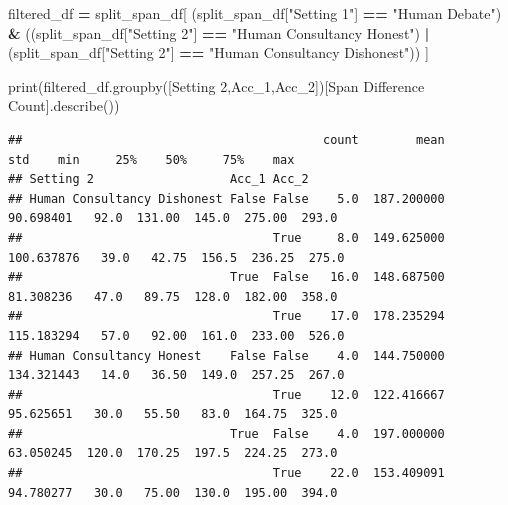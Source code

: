 \documentclass[
]{article}
\newenvironment{Shaded}{\begin{snugshade}}{\end{snugshade}}
\newcommand{\BuiltInTok}[1]{#1}
\newcommand{\NormalTok}[1]{#1}
\newcommand{\OperatorTok}[1]{\textcolor[rgb]{0.81,0.36,0.00}{\textbf{#1}}}
\newcommand{\StringTok}[1]{\textcolor[rgb]{0.31,0.60,0.02}{#1}}
\begin{document}
\begin{Shaded}
\begin{Highlighting}[]
\NormalTok{filtered\_df }\OperatorTok{=}\NormalTok{ split\_span\_df[}
\NormalTok{    (split\_span\_df[}\StringTok{"Setting 1"}\NormalTok{] }\OperatorTok{==} \StringTok{"Human Debate"}\NormalTok{) }\OperatorTok{\&}
\NormalTok{    ((split\_span\_df[}\StringTok{"Setting 2"}\NormalTok{] }\OperatorTok{==} \StringTok{"Human Consultancy Honest"}\NormalTok{) }\OperatorTok{|}\NormalTok{ (split\_span\_df[}\StringTok{"Setting 2"}\NormalTok{] }\OperatorTok{==} \StringTok{"Human Consultancy Dishonest"}\NormalTok{))}
\NormalTok{]}

\BuiltInTok{print}\NormalTok{(filtered\_df.groupby([}\StringTok{\textquotesingle{}Setting 2\textquotesingle{}}\NormalTok{,}\StringTok{\textquotesingle{}Acc\_1\textquotesingle{}}\NormalTok{,}\StringTok{\textquotesingle{}Acc\_2\textquotesingle{}}\NormalTok{])[}\StringTok{\textquotesingle{}Span Difference Count\textquotesingle{}}\NormalTok{].describe())}
\end{Highlighting}
\end{Shaded}

\begin{verbatim}
##                                          count        mean         std    min     25%    50%     75%    max
## Setting 2                   Acc_1 Acc_2                                                                    
## Human Consultancy Dishonest False False    5.0  187.200000   90.698401   92.0  131.00  145.0  275.00  293.0
##                                   True     8.0  149.625000  100.637876   39.0   42.75  156.5  236.25  275.0
##                             True  False   16.0  148.687500   81.308236   47.0   89.75  128.0  182.00  358.0
##                                   True    17.0  178.235294  115.183294   57.0   92.00  161.0  233.00  526.0
## Human Consultancy Honest    False False    4.0  144.750000  134.321443   14.0   36.50  149.0  257.25  267.0
##                                   True    12.0  122.416667   95.625651   30.0   55.50   83.0  164.75  325.0
##                             True  False    4.0  197.000000   63.050245  120.0  170.25  197.5  224.25  273.0
##                                   True    22.0  153.409091   94.780277   30.0   75.00  130.0  195.00  394.0
\end{verbatim}
\end{document}
